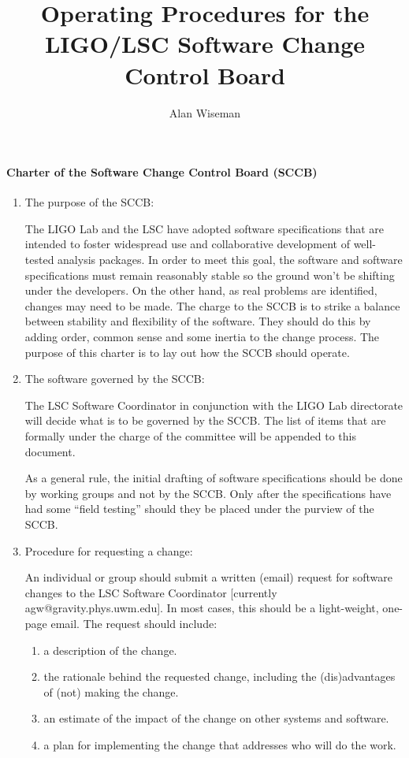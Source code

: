 \documentclass[]{ligodcc}
\title{ Operating Procedures for the LIGO/LSC  Software Change Control Board}
\author{Alan Wiseman}
\begin{document}
\maketitle

\paragraph*{Charter of the Software Change Control Board (SCCB)\\}
\begin{enumerate}
\item
\vskip -0.3in
The purpose of the SCCB:

The LIGO Lab and the LSC have adopted software specifications that are
intended to foster widespread use and collaborative development of
well-tested analysis packages.  In order to meet this goal, the
software and software specifications must remain reasonably stable
so the ground won't be shifting under the developers.  On the other
hand, as real problems are identified, changes may need to be made.
The charge to the SCCB is to strike a balance between stability and
flexibility of the software. They should do this by adding order,
common sense and some inertia to the change process.  The purpose of
this charter is to lay out how the SCCB should operate.


\item
The software governed by the SCCB:

The LSC Software Coordinator in conjunction with the LIGO Lab
directorate will decide what is to be governed by the SCCB.  The list
of items that are formally under the charge of the committee will be
appended to this document.

As a general rule, the initial drafting of software specifications
should be done by working groups and not by the SCCB.  Only after the
specifications have had some ``field testing'' should they be placed
under the purview of the SCCB.

\item
Procedure for requesting a change:

An individual or group should submit a written (email) request for
software changes to the LSC Software Coordinator [currently
agw@gravity.phys.uwm.edu].  In most cases, this should be a
light-weight, one-page email. The request should include:

   \begin{enumerate}
   \item
   \vskip -0.1in
   a description of the change.
   \item
   the rationale behind the requested change, including the
   (dis)advantages of (not) making the change.
   \item
   an estimate of the impact of the change on other systems and
   software.
   \item
   a plan for implementing the change that addresses who will 
   do the work.
   \end{enumerate}


\end{enumerate}
\end{document}
